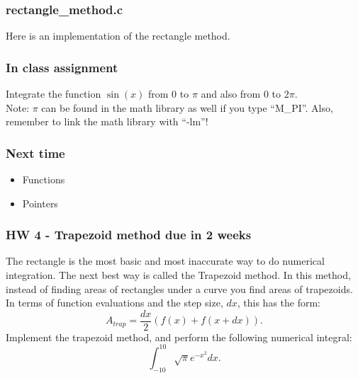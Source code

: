 \documentclass{beamer}
\begin{document}
\begin{frame}
  \frametitle{rectangle\_method.c}
  Here is an implementation of the rectangle method.
  
\end{frame}

\begin{frame}
  \frametitle{In class assignment}
  Integrate the function $\sin(x)$ from $0$ to $\pi$ and also from
  $0$ to $2\pi$. \\
  Note: $\pi$ can be found in the math library as well if you type
  ``M\_PI''. Also, remember to link the math library with ``-lm''!
\end{frame}

\begin{frame}
  \frametitle{Next time}
  \begin{itemize}
    \item Functions
    \item Pointers
  \end{itemize}
\end{frame}

\begin{frame}
  \frametitle{HW 4 - Trapezoid method due in 2 weeks}
  The rectangle is the most basic and most inaccurate way to do
  numerical integration. The next best way is called the Trapezoid method.
  In this method, instead of finding areas of rectangles under a curve you find
  areas of trapezoids. In terms of function evaluations and the step
  size, $dx$, this has the form:
  \begin{equation*}
    A_{trap} = \frac{dx}{2}(f(x)+f(x+dx)).
  \end{equation*}
  Implement the trapezoid method, and perform the following numerical integral:
  \begin{equation*}
    \int_{-10}^{10}\sqrt{\pi}e^{-x^2}dx.
  \end{equation*}
\end{frame}
\end{document}
